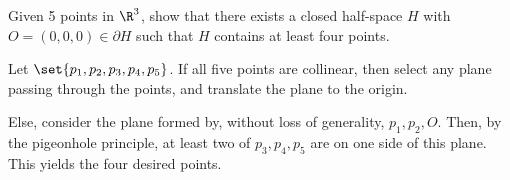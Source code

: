 \documentclass[10pt]{mypackage}
\begin{document}
\begin{problem}
Given 5 points in $\R^3$, show that there exists a closed half-space $H$ with $O = (0,0,0)\in \partial H$ such that $H$ contains at least four points.
\end{problem}
\begin{solution}
  Let $\set{p_1,p_2,p_3,p_4,p_5}$. If all five points are collinear, then select any plane passing through the points, and translate the plane to the origin.\newline

  Else, consider the plane formed by, without loss of generality, $p_1,p_2,O$. Then, by the pigeonhole principle, at least two of $p_3,p_4,p_5$ are on one side of this plane. This yields the four desired points.
\end{solution}
\end{document}
